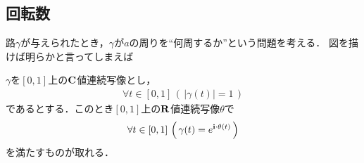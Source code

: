 \subsection{回転数}
	
	路$\gamma$が与えられたとき，$\gamma$が$a$の周りを``何周するか''という問題を考える．
	図を描けば明らかと言ってしまえば
	
	\begin{screen}
		\begin{thm}[路の偏角の連続選択]\label{thm:continuous_choice_of_arguments}
			$\gamma$を$[0,1]$上の$\mathbf{C}$値連続写像とし，
			\begin{align}
				\forall t \in [0,1]\, (\, |\gamma(t)| = 1\, )
			\end{align}
			であるとする．このとき$[0,1]$上の$\mathbf{R}$値連続写像$\theta$で
			\begin{align}
				\forall t \in [0,1]\, \left(\, \gamma(t) = e^{\mathbf{i}\cdot\theta(t)}\, \right)
			\end{align}
			を満たすものが取れる．
		\end{thm}
	\end{screen}
	
